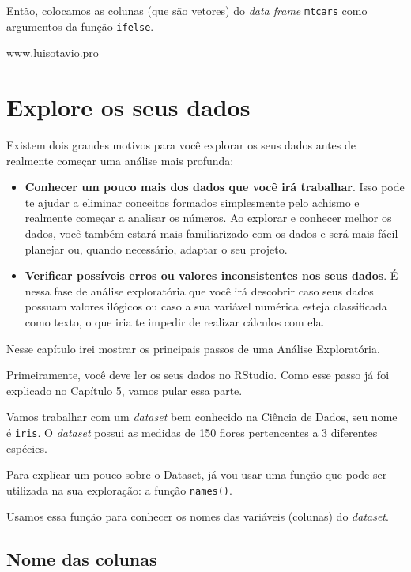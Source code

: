 \documentclass[
]{book}
\begin{document}
Então, colocamos as colunas (que são vetores) do \emph{data frame}
\texttt{mtcars} como argumentos da função \texttt{ifelse}.

www.luisotavio.pro

\hypertarget{explore-os-seus-dados}{%
\chapter{Explore os seus dados}\label{explore-os-seus-dados}}

Existem dois grandes motivos para você explorar os seus dados antes de
realmente começar uma análise mais profunda:

\begin{itemize}
\item
  \textbf{Conhecer um pouco mais dos dados que você irá trabalhar}. Isso
  pode te ajudar a eliminar conceitos formados simplesmente pelo achismo
  e realmente começar a analisar os números. Ao explorar e conhecer
  melhor os dados, você também estará mais familiarizado com os dados e
  será mais fácil planejar ou, quando necessário, adaptar o seu projeto.
\item
  \textbf{Verificar possíveis erros ou valores inconsistentes nos seus
  dados}. É nessa fase de análise exploratória que você irá descobrir
  caso seus dados possuam valores ilógicos ou caso a sua variável
  numérica esteja classificada como texto, o que iria te impedir de
  realizar cálculos com ela.
\end{itemize}

Nesse capítulo irei mostrar os principais passos de uma Análise
Exploratória.

Primeiramente, você deve ler os seus dados no RStudio. Como esse passo
já foi explicado no Capítulo 5, vamos pular essa parte.

Vamos trabalhar com um \emph{dataset} bem conhecido na Ciência de Dados,
seu nome é \texttt{iris}. O \emph{dataset} possui as medidas de 150
flores pertencentes a 3 diferentes espécies.

Para explicar um pouco sobre o Dataset, já vou usar uma função que pode
ser utilizada na sua exploração: a função \texttt{names()}.

Usamos essa função para conhecer os nomes das variáveis (colunas) do
\emph{dataset}.

\hypertarget{nome-das-colunas}{%
\section{Nome das colunas}\label{nome-das-colunas}}
\end{document}
